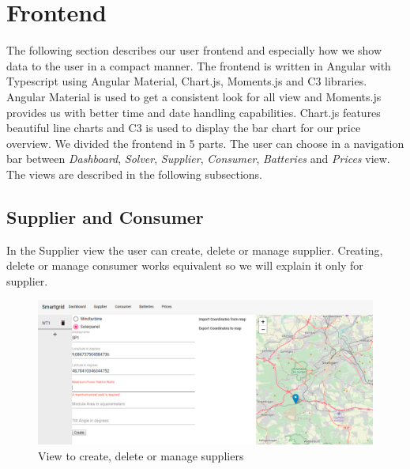 \section{Frontend}\label{sec:frontend}
The following section describes our user frontend and especially how we show data to the user in a compact manner.
The frontend is written in Angular with Typescript using Angular Material, Chart.js, Moments.js and C3 libraries. 
Angular Material is used to get a consistent look for all view and Moments.js provides us with better time and date handling capabilities. Chart.js features beautiful line charts and C3 is used to display the bar chart for our price overview.  
We divided the frontend in 5 parts.
The user can choose in a navigation bar between \textit{Dashboard},
\textit{Solver}, \textit{Supplier}, \textit{Consumer}, \textit{Batteries} and \textit{Prices} view.
The views are described in the following subsections.

\subsection{Supplier and Consumer}
In the Supplier view the user can create, delete or manage supplier.
Creating, delete or manage consumer works equivalent so we will explain it only for supplier.

\begin{figure}[!h]
    \centering
    \includegraphics[width=1.00\textwidth]{../figures/supplierView.PNG}
    \caption{View to create, delete or manage suppliers}
    \label{fig:suppliers}
\end{figure}

